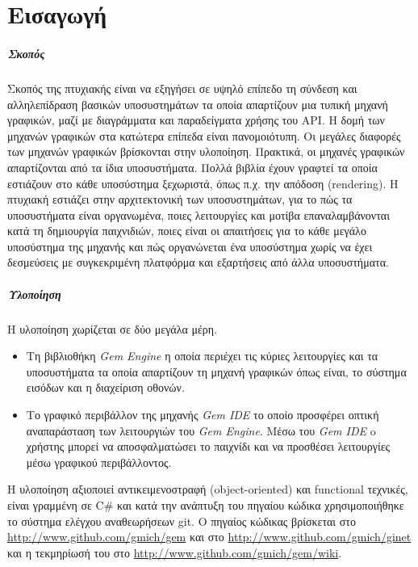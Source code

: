 \chapter{Εισαγωγή}
	\paragraph{Σκοπός}
	Σκοπός της πτυχιακής είναι να εξηγήσει σε υψηλό επίπεδο τη σύνδεση και αλληλεπίδραση βασικών υποσυστημάτων τα οποία απαρτίζουν μια
	τυπική μηχανή γραφικών, μαζί με διαγράμματα και παραδείγματα χρήσης του \gls{API}. 
	Η δομή των μηχανών γραφικών στα κατώτερα επίπεδα είναι πανομοιότυπη. Οι μεγάλες διαφορές των μηχανών γραφικών βρίσκονται στην υλοποίηση. Πρακτικά, οι μηχανές γραφικών απαρτίζονται από τα ίδια υποσυστήματα. Πολλά βιβλία έχουν γραφτεί τα οποία εστιάζουν στο κάθε υποσύστημα ξεχωριστά, όπως π.χ. την απόδοση (rendering).
	Η πτυχιακή εστιάζει στην αρχιτεκτονική των υποσυστημάτων, για το πώς τα υποσυστήματα είναι οργανωμένα, ποιες λειτουργίες και μοτίβα επαναλαμβάνονται κατά τη δημιουργία παιχνιδιών, ποιες είναι οι απαιτήσεις για το κάθε μεγάλο υποσύστημα της μηχανής και πώς οργανώνεται ένα υποσύστημα χωρίς να έχει δεσμεύσεις με συγκεκριμένη πλατφόρμα και εξαρτήσεις από άλλα υποσυστήματα.

	\paragraph{Υλοποίηση}
	Η υλοποίηση χωρίζεται σε δύο μεγάλα μέρη.	
	\begin{itemize}
		\item Τη βιβλιοθήκη \textit{Gem Engine} η οποία περιέχει τις κύριες λειτουργίες και τα υποσυστήματα τα οποία απαρτίζουν τη μηχανή γραφικών όπως είναι, το σύστημα εισόδων και η διαχείριση οθονών.
		\item Tο γραφικό περιβάλλον της μηχανής \textit{Gem IDE} το οποίο προσφέρει οπτική αναπαράσταση των λειτουργιών του \textit{Gem Engine}. Μέσω του \textit{Gem IDE} o χρήστης μπορεί να αποσφαλματώσει το παιχνίδι και να προσθέσει λειτουργίες μέσω γραφικού περιβάλλοντος.
	\end{itemize}
	H υλοποίηση αξιοποιεί αντικειμενοστραφή (object-oriented) και functional τεχνικές, είναι γραμμένη σε C\# και κατά την ανάπτυξη του πηγαίου κώδικα χρησιμοποιήθηκε το σύστημα ελέγχου αναθεωρήσεων git. Ο πηγαίος κώδικας βρίσκεται στο \url{http://www.github.com/gmich/gem} και στο \url{http://www.github.com/gmich/ginet} και η τεκμηρίωσή του στο \url{http://www.github.com/gmich/gem/wiki}.	
	
